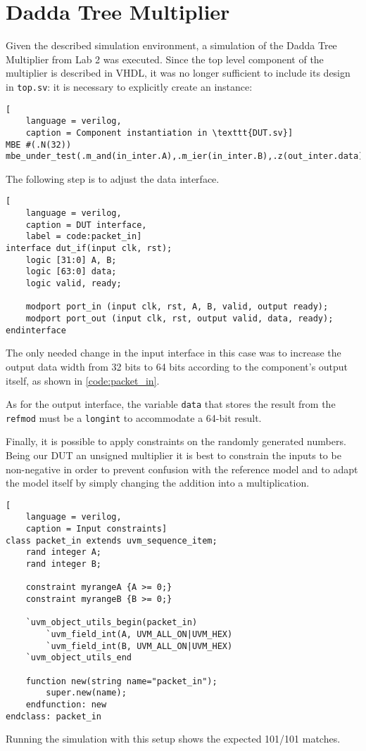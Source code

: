 \chapter{Dadda Tree Multiplier}
Given the described simulation environment, a simulation of the Dadda Tree Multiplier from Lab 2 was executed.
Since the top level component of the multiplier is described in VHDL, it was no longer sufficient to include its design
in \texttt{top.sv}: it is necessary to explicitly create an instance:
\begin{lstlisting}[
    language = verilog,
    caption = Component instantiation in \texttt{DUT.sv}]
MBE #(.N(32)) mbe_under_test(.m_and(in_inter.A),.m_ier(in_inter.B),.z(out_inter.data));
\end{lstlisting}

The following step is to adjust the data interface.

\begin{lstlisting}[
    language = verilog,
    caption = DUT interface, 
    label = code:packet_in]
interface dut_if(input clk, rst);
    logic [31:0] A, B;
    logic [63:0] data;
    logic valid, ready;

    modport port_in (input clk, rst, A, B, valid, output ready);
    modport port_out (input clk, rst, output valid, data, ready);
endinterface
\end{lstlisting}
The only needed change in the input interface in this case was to increase the output data width from 32 bits to 64 bits according to the
component's output itself, as shown in \ref{code:packet_in}.

As for the output interface, the variable \texttt{data} that stores the result from the \texttt{refmod} must be a \texttt{longint} to accommodate a 64-bit result. 

Finally, it is possible to apply constraints on the randomly generated numbers. Being our DUT an unsigned multiplier it is
best to constrain the inputs to be non-negative in order to prevent confusion with the reference model and to adapt
the model itself by simply changing the addition into a multiplication.

\begin{lstlisting}[
    language = verilog,
    caption = Input constraints]
class packet_in extends uvm_sequence_item;
    rand integer A;
    rand integer B;

	constraint myrangeA {A >= 0;}
	constraint myrangeB {B >= 0;}

    `uvm_object_utils_begin(packet_in)
        `uvm_field_int(A, UVM_ALL_ON|UVM_HEX)
        `uvm_field_int(B, UVM_ALL_ON|UVM_HEX)
    `uvm_object_utils_end

    function new(string name="packet_in");
        super.new(name);
    endfunction: new
endclass: packet_in

\end{lstlisting}

Running the simulation with this setup shows the expected 101/101 matches.
